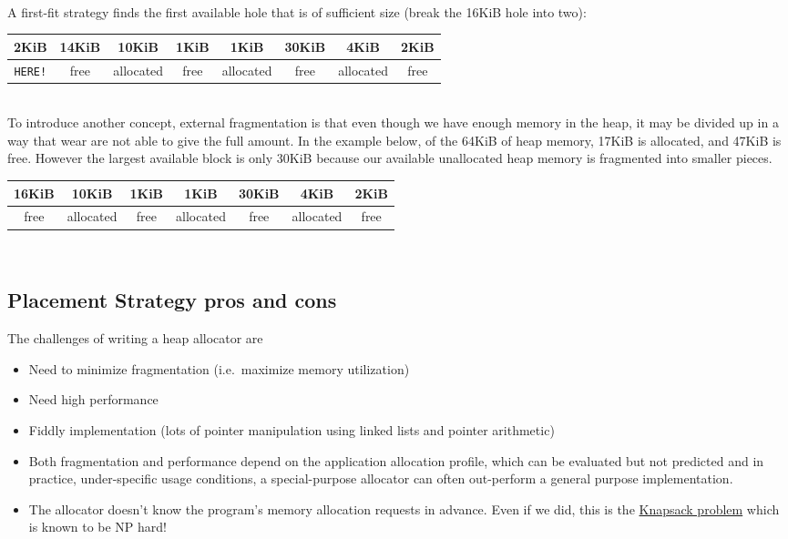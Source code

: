 \\
A first-fit strategy finds the first available hole that is of sufficient size (break the 16KiB hole into two):
\\
\begin{center}
\begin{tabular}{ | c | c | c | c | c | c | c | c | }
\hline
2KiB & 14KiB & 10KiB & 1KiB & 1KiB & 30KiB & 4KiB & 2KiB \\ \hline
\texttt{HERE!} & free & allocated & free & allocated & free & allocated & free \\
\hline
\end{tabular}
\end{center}
\\

To introduce another concept, external fragmentation is that even though we have enough memory in the heap, it may be divided up in a way that wear are not able to give the full amount.
In the example below, of the 64KiB of heap memory, 17KiB is allocated, and 47KiB is free.
However the largest available block is only 30KiB because our available unallocated heap memory is fragmented into smaller pieces.
\\
\begin{center}
\begin{tabular}{ | c | c | c | c | c | c | c | }
\hline
16KiB & 10KiB & 1KiB & 1KiB & 30KiB & 4KiB & 2KiB \\ \hline
free & allocated & free & allocated & free & allocated & free \\
\hline
\end{tabular}
\end{center}
\\

\subsection{Placement Strategy pros and cons}

The challenges of writing a heap allocator are
\begin{itemize}
\item Need to minimize fragmentation (i.e.~maximize memory utilization)
\item Need high performance
\item Fiddly implementation (lots of pointer manipulation using linked lists and pointer arithmetic)
\item Both fragmentation and performance depend on the application allocation profile, which can be evaluated but not predicted and in practice, under-specific usage conditions, a special-purpose allocator can often out-perform a general purpose implementation.
\item The allocator doesn't know the program's memory allocation requests in advance. Even if we did, this is the \href{http://en.wikipedia.org/wiki/Knapsack_problem}{Knapsack problem} which is known to be NP hard!
\end{itemize}

